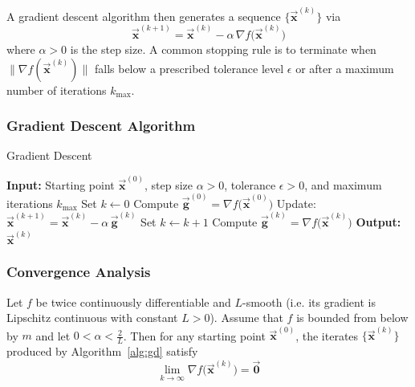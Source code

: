 \documentclass[9pt, headings=standardclasses, parskip=half]{scrartcl}
\newcommand{\vect}[1]{\vec{\boldsymbol{#1}}}
\begin{document}
A gradient descent algorithm then generates a sequence \(\{\vect{x}^{(k)}\}\) via
\[
\vect{x}^{(k+1)}=\vect{x}^{(k)}-\alpha\,\nabla f\bigl(\vect{x}^{(k)}\bigr)
\]
where \(\alpha>0\) is the step size. 
A common stopping rule is to terminate when \(\|\nabla f(\vect{x}^{(k)})\|\) falls below a prescribed tolerance level \(\epsilon\) or after a maximum number of iterations \(k_{\max}\).

\subsubsection{Gradient Descent Algorithm}
\begin{algorithm}[H]
\caption{Gradient Descent}\label{alg:gd}
\begin{algorithmic}[1]
    \State \textbf{Input:} Starting point \(\vect{x}^{(0)}\), step size \(\alpha>0\), tolerance \(\epsilon>0\), and maximum iterations \(k_{\max}\)
    \State Set \(k\gets0\)
    \State Compute \(\vect{g}^{(0)}=\nabla f\bigl(\vect{x}^{(0)}\bigr)\)
    \While{\(\|\vect{g}^{(k)}\|>\epsilon\) and \(k<k_{\max}\)}
        \State Update: \(\vect{x}^{(k+1)}=\vect{x}^{(k)}-\alpha\,\vect{g}^{(k)}\)
        \State Set \(k\gets k+1\)
        \State Compute \(\vect{g}^{(k)}=\nabla f\bigl(\vect{x}^{(k)}\bigr)\)
    \EndWhile
    \State \textbf{Output:} \(\vect{x}^{(k)}\)
\end{algorithmic}
\end{algorithm}

\subsubsection{Convergence Analysis}
\label{subsec:gd_convergence}
\begin{theorem}
\label{thm:gd_conv}
Let \(f\) be twice continuously differentiable and \(L\)-smooth (i.e. its gradient is Lipschitz continuous with constant \(L>0\)). Assume that \(f\) is bounded from below by \(m\) and let \( 0<\alpha<\frac{2}{L}\).
Then for any starting point \(\vect{x}^{(0)}\), the iterates \(\{\vect{x}^{(k)}\}\) produced by Algorithm~\ref{alg:gd} satisfy
\begin{equation}
\label{eq:gd_conv}
\lim_{k\to\infty}\nabla f\bigl(\vect{x}^{(k)}\bigr)=\vect{0}
\end{equation}
\end{theorem}
\end{document}
